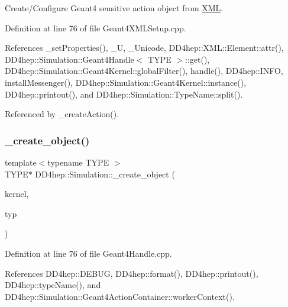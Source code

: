 Create/\+Configure Geant4 sensitive action object from \hyperlink{namespace_d_d4hep_1_1_x_m_l}{X\+ML}. 



Definition at line 76 of file Geant4\+X\+M\+L\+Setup.\+cpp.



References \+\_\+set\+Properties(), \+\_\+U, \+\_\+\+Unicode, D\+D4hep\+::\+X\+M\+L\+::\+Element\+::attr(), D\+D4hep\+::\+Simulation\+::\+Geant4\+Handle$<$ T\+Y\+P\+E $>$\+::get(), D\+D4hep\+::\+Simulation\+::\+Geant4\+Kernel\+::global\+Filter(), handle(), D\+D4hep\+::\+I\+N\+FO, install\+Messenger(), D\+D4hep\+::\+Simulation\+::\+Geant4\+Kernel\+::instance(), D\+D4hep\+::printout(), and D\+D4hep\+::\+Simulation\+::\+Type\+Name\+::split().



Referenced by \+\_\+create\+Action().

\hypertarget{namespace_d_d4hep_1_1_simulation_ada295bc8061b944b5583f4745bbe48cb}{}\label{namespace_d_d4hep_1_1_simulation_ada295bc8061b944b5583f4745bbe48cb} 
\subsubsection{\texorpdfstring{\+\_\+create\+\_\+object()}{\_create\_object()}}
{\footnotesize\ttfamily template$<$typename T\+Y\+PE $>$ \\
T\+Y\+PE$\ast$ D\+D4hep\+::\+Simulation\+::\+\_\+create\+\_\+object (\begin{DoxyParamCaption}\item[{\hyperlink{class_d_d4hep_1_1_simulation_1_1_geant4_kernel}{Geant4\+Kernel} \&}]{kernel,  }\item[{const \hyperlink{class_d_d4hep_1_1_simulation_1_1_type_name}{Type\+Name} \&}]{typ }\end{DoxyParamCaption})}



Definition at line 76 of file Geant4\+Handle.\+cpp.



References D\+D4hep\+::\+D\+E\+B\+UG, D\+D4hep\+::format(), D\+D4hep\+::printout(), D\+D4hep\+::type\+Name(), and D\+D4hep\+::\+Simulation\+::\+Geant4\+Action\+Container\+::worker\+Context().

\hypertarget{namespace_d_d4hep_1_1_simulation_a9e5ceb82c385d92f0623b96ed789b01a}{}\label{namespace_d_d4hep_1_1_simulation_a9e5ceb82c385d92f0623b96ed789b01a} 
